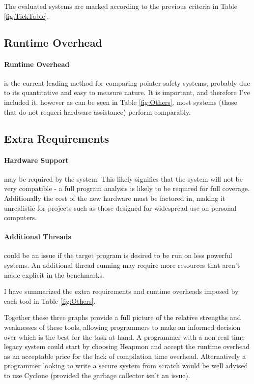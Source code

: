 The evaluated systems are marked according to the previous criteria in Table \ref{fig:TickTable}.

\subsection{Runtime Overhead}

\paragraph{Runtime Overhead} is the current leading method for comparing pointer-safety systems, probably due to its quantitative and easy to measure nature.
It is important, and therefore I've included it, however as can be seen in Table \ref{fig:Others}, most systems (those that do not requeri hardware assistance) perform comparably.

\subsection{Extra Requirements}

\paragraph{Hardware Support} may be required by the system.
This likely signifies that the system will not be very compatible - a full program analysis is likely to be required for full coverage.
Additionally the cost of the new hardware must be factored in, making it unrealistic for projects such as those designed for widespread use on personal computers.

\paragraph{Additional Threads} could be an issue if the target program is desired to be run on less powerful systems.
An additional thread running may require more resources that aren't made explicit in the benchmarks.

I have summarized the extra requirements and runtime overheads imposed by each tool in Table \ref{fig:Others}.

Together these three graphs provide a full picture of the relative strengths and weaknesses of these tools, allowing programmers to make an informed decision over which is the best for the task at hand.
A programmer with a non-real time legacy system could start by choosing Heapmon and accept the runtime overhead as an acceptable price for the lack of compilation time overhead.
Alternatively a programmer looking to write a secure system from scratch would be well advised to use Cyclone (provided the garbage collector isn't an issue).

